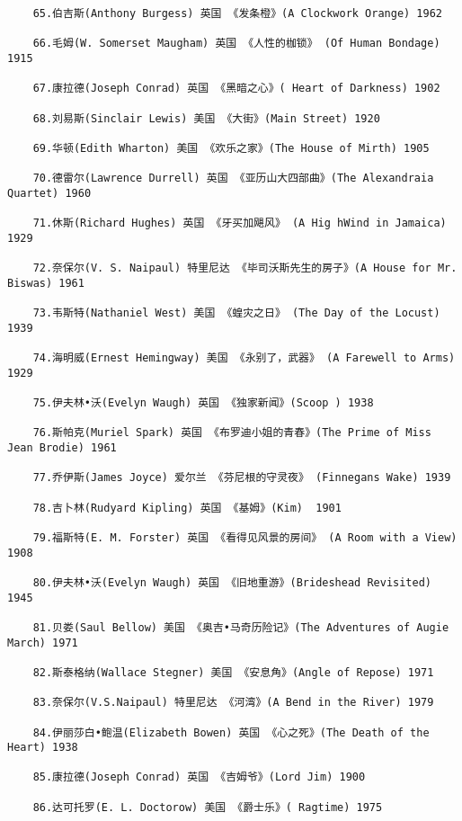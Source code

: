 \documentclass[UTF8]{../../RepresentationUniverse}
\begin{document}
\begin{lstlisting}
    65.伯吉斯(Anthony Burgess) 英国 《发条橙》(A Clockwork Orange) 1962
    
    66.毛姆(W. Somerset Maugham) 英国 《人性的枷锁》 (Of Human Bondage) 1915
    
    67.康拉德(Joseph Conrad) 英国 《黑暗之心》( Heart of Darkness) 1902
    
    68.刘易斯(Sinclair Lewis) 美国 《大街》(Main Street) 1920
    
    69.华顿(Edith Wharton) 美国 《欢乐之家》(The House of Mirth) 1905
    
    70.德雷尔(Lawrence Durrell) 英国 《亚历山大四部曲》(The Alexandraia Quartet) 1960
    
    71.休斯(Richard Hughes) 英国 《牙买加飓风》 (A Hig hWind in Jamaica) 1929
    
    72.奈保尔(V. S. Naipaul) 特里尼达 《毕司沃斯先生的房子》(A House for Mr. Biswas) 1961
    
    73.韦斯特(Nathaniel West) 美国 《蝗灾之日》 (The Day of the Locust) 1939
    
    74.海明威(Ernest Hemingway) 美国 《永别了，武器》 (A Farewell to Arms) 1929
    
    75.伊夫林•沃(Evelyn Waugh) 英国 《独家新闻》(Scoop ) 1938
    
    76.斯帕克(Muriel Spark) 英国 《布罗迪小姐的青春》(The Prime of Miss Jean Brodie) 1961
    
    77.乔伊斯(James Joyce) 爱尔兰 《芬尼根的守灵夜》 (Finnegans Wake) 1939
    
    78.吉卜林(Rudyard Kipling) 英国 《基姆》(Kim)  1901
    
    79.福斯特(E. M. Forster) 英国 《看得见风景的房间》 (A Room with a View) 1908
    
    80.伊夫林•沃(Evelyn Waugh) 英国 《旧地重游》(Brideshead Revisited) 1945
    
    81.贝娄(Saul Bellow) 美国 《奥吉•马奇历险记》(The Adventures of Augie March) 1971
    
    82.斯泰格纳(Wallace Stegner) 美国 《安息角》(Angle of Repose) 1971
    
    83.奈保尔(V.S.Naipaul) 特里尼达 《河湾》(A Bend in the River) 1979
    
    84.伊丽莎白•鲍温(Elizabeth Bowen) 英国 《心之死》(The Death of the Heart) 1938
    
    85.康拉德(Joseph Conrad) 英国 《吉姆爷》(Lord Jim) 1900
    
    86.达可托罗(E. L. Doctorow) 美国 《爵士乐》( Ragtime) 1975
    

\end{lstlisting}
\end{document}
